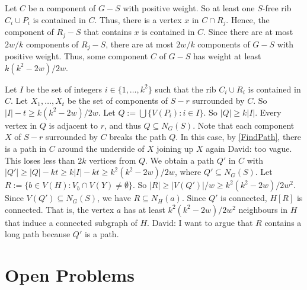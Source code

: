 \documentclass{patmorin}
\renewcommand{\geq}{\geqslant}
\newcommand{\david}[1]{{\color{orange} David: #1}}
\newcommand{\pat}[1]{\textcolor{Blue}{Pat: #1}}
\begin{document}
Let $C$ be a component of $G-S$ with positive weight. So at least one $S$-free rib $C_i\cup P_i$ is contained in $C$. Thus, there is a vertex $x$ in $C\cap R_j$. Hence, the component of $R_j-S$ that contains $x$ is contained in $C$. Since there are at most $2w/k$ components of $R_j-S$, there are at most $2w/k$ components of $G-S$ with positive weight. Thus, some component $C$ of $G-S$ has weight at least $k(k^2-2w)/2w$.

Let $I$ be the set of integers $i\in\{1,\dots,k^2\}$ such that the rib $C_i\cup R_i$ is contained in $C$. Let $X_1,\dots,X_t$ be the set of components of $S-r$ surrounded by $C$. So $|I|-t\geq k(k^2-2w)/2w$. Let $Q:=\bigcup\{V(P_i):i\in I\}$. So $|Q|\geq k|I|$. Every vertex in $Q$ is adjacent to $r$, and thus $Q\subseteq N_G(S)$. Note that each component $X$ of $S-r$ surrounded by $C$ breaks the path $Q$. In this case, by \cref{FindPath}, there is a path in $C$ around the underside of $X$ joining up $X$ again \david{too vague}. This loses less than $2k$ vertices from $Q$. We obtain a path $Q'$ in $C$ with $|Q'|\geq |Q|-kt \geq k|I|-kt \geq k^2(k^2-2w)/2w$, where $Q'\subseteq N_G(S)$.
Let $R:=\{ b\in V(H): V_b\cap V(Y)\neq\emptyset\}$. So $|R|\geq |V(Q')|/w\geq k^2(k^2-2w)/2w^2$. Since $V(Q')\subseteq N_G(S)$, we have $R\subseteq N_H(a)$. Since $Q'$ is connected, $H[R]$ is connected. That is, the vertex $a$ has at least $k^2(k^2-2w)/2w^2$ neighbours in $H$ that induce a connected subgraph of $H$. \david{I want to argue that $R$ contains a long path because $Q'$ is a path. }



\section{Open Problems}
\end{document}
